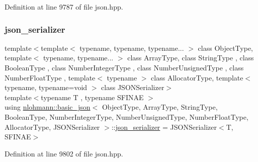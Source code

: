 Definition at line 9787 of file json.\+hpp.

\mbox{\label{classnlohmann_1_1basic__json_a7768841baaaa7a21098a401c932efaff}} 
\subsubsection{\texorpdfstring{json\+\_\+serializer}{json\_serializer}}
{\footnotesize\ttfamily template$<$template$<$ typename, typename, typename... $>$ class Object\+Type, template$<$ typename, typename... $>$ class Array\+Type, class String\+Type , class Boolean\+Type , class Number\+Integer\+Type , class Number\+Unsigned\+Type , class Number\+Float\+Type , template$<$ typename $>$ class Allocator\+Type, template$<$ typename, typename=void $>$ class J\+S\+O\+N\+Serializer$>$ \\
template$<$typename T , typename S\+F\+I\+N\+AE $>$ \\
using \hyperlink{classnlohmann_1_1basic__json}{nlohmann\+::basic\+\_\+json}$<$ Object\+Type, Array\+Type, String\+Type, Boolean\+Type, Number\+Integer\+Type, Number\+Unsigned\+Type, Number\+Float\+Type, Allocator\+Type, J\+S\+O\+N\+Serializer $>$\+::\hyperlink{classnlohmann_1_1basic__json_a7768841baaaa7a21098a401c932efaff}{json\+\_\+serializer} =  J\+S\+O\+N\+Serializer$<$T, S\+F\+I\+N\+AE$>$}



Definition at line 9802 of file json.\+hpp.

\mbox{\label{classnlohmann_1_1basic__json_a163540181fa07868de2902ecdb6df2ae}} 
